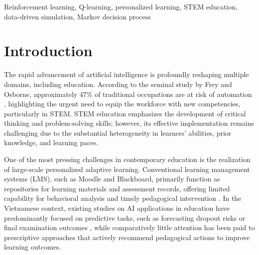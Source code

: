 \documentclass[conference]{IEEEtran}
\begin{document}
\begin{abstract}
In the context of education 4.0, conventional learning management systems often lack effective personalization mechanisms, typically enforcing a uniform learning path for all learners. To address this limitation in STEM education, this paper proposes an adaptive learning framework based on the Q-learning algorithm, integrated into the Moodle platform via the LTI 1.3 standard. The learning process is modeled as a Markov decision process, combined with behavioral clustering to construct a multidimensional learner state space. To mitigate data scarcity and the cold-start problem, we introduce a data-driven simulation strategy that preserves the distributional characteristics of real learner behavior. Experimental results from 500 simulation iterations demonstrate that the proposed approach significantly outperforms traditional methods, achieving a 22.5\% improvement in average scores and a 51.0\% reduction in weak skills, thereby highlighting its potential for scalable, personalized STEM education.
\end{abstract}

\begin{IEEEkeywords}
Reinforcement learning, Q-learning, personalized learning, STEM education, data-driven simulation, Markov decision process
\end{IEEEkeywords}


\section{Introduction}
\label{sec:intro}

The rapid advancement of artificial intelligence is profoundly reshaping multiple domains, including education. According to the seminal study by Frey and Osborne, approximately 47\% of traditional occupations are at risk of automation \cite{frey2017future}, highlighting the urgent need to equip the workforce with new competencies, particularly in STEM. STEM education emphasizes the development of critical thinking and problem-solving skills; however, its effective implementation remains challenging due to the substantial heterogeneity in learners’ abilities, prior knowledge, and learning paces.

One of the most pressing challenges in contemporary education is the realization of large-scale personalized adaptive learning. Conventional learning management systems (LMS), such as Moodle and Blackboard, primarily function as repositories for learning materials and assessment records, offering limited capability for behavioral analysis and timely pedagogical intervention \cite{capuano2020adaptive}. In the Vietnamese context, existing studies on AI applications in education have predominantly focused on predictive tasks, such as forecasting dropout risks or final examination outcomes \cite{thuan2022ung, sang2020du}, while comparatively little attention has been paid to prescriptive approaches that actively recommend pedagogical actions to improve learning outcomes.
\end{document}
